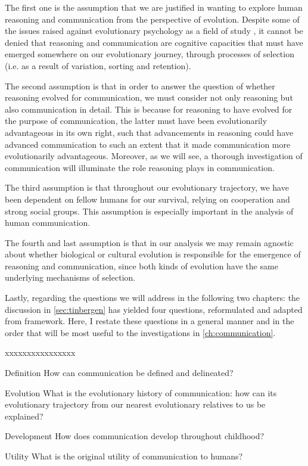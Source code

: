 The first one is the assumption that we are justified in wanting to explore human reasoning and communication from the perspective of evolution. Despite some of the issues raised against evolutionary psychology as a field of study \citep{LB02}, it cannot be denied that reasoning and communication are cognitive capacities that must have emerged somewhere on our evolutionary journey, through processes of selection (i.e. as a result of variation, sorting and retention).

The second assumption is that in order to answer the question of whether reasoning evolved for communication, we must consider not only reasoning but also communication in detail. This is because for reasoning to have evolved for the purpose of communication, the latter must have been evolutionarily advantageous in its own right, such that advancements in reasoning could have advanced communication to such an extent that it made communication more evolutionarily advantageous.
Moreover, as we will see, a thorough investigation of communication will illuminate the role reasoning plays in communication.

The third assumption is that throughout our evolutionary trajectory, we have been dependent on fellow humans for our survival, relying on cooperation and strong social groups. This assumption is especially important in the analysis of human communication.

The fourth and last assumption is that in our analysis we may remain agnostic about whether biological or cultural evolution is responsible for the emergence of reasoning and communication, since both kinds of evolution have the same underlying mechanisms of selection.

Lastly, regarding the questions we will address in the following two chapters: the discussion in \cref{sec:tinbergen} has yielded four questions, reformulated and adapted from  framework. Here, I restate these questions in a general manner and in the order that will be most useful to the investigations in \cref{ch:communication}.

\begin{labeling}{xxxxxxxxxxxxxxxx}
    \item [Definition] How can communication be defined and delineated?
    \item [Evolution] What is the evolutionary history of communication: how can its evolutionary trajectory from our nearest evolutionary relatives to us be explained?
    \item [Development] How does communication develop throughout childhood?
    \item [Utility] What is the original utility of communication to humans?
\end{labeling}

